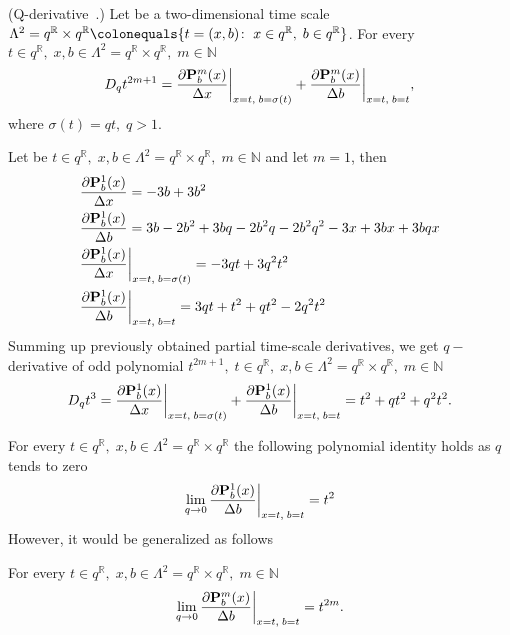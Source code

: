 \begin{cor}
    \label{q_derivative_case}
    (Q-derivative~\cite{jackson_1909}.)
    Let be a two-dimensional time scale
    $\Lambda^2 = q^{\mathbb{R}} \times q^{\mathbb{R}} \colonequals \{t=(x,b) \colon \; x\in q^{\mathbb{R}}, \; b \in q^{\mathbb{R}} \}$.
    For every $t\in q^{\mathbb{R}}, \; x,b\in \Lambda^2 = q^{\mathbb{R}} \times q^{\mathbb{R}}, \; m\in\mathbb{N}$
    \[
        D_{q} t^{2m+1}
        = \frac{\partial {\mathbf{P}}\sp{m} \sb{b}(x)}{\Delta x} \bigg |_{x = t, \; b = \sigma(t)}
        + \frac{\partial {\mathbf{P}}\sp{m} \sb{b}(x)}{\Delta b} \bigg |_{x = t, \; b = t},
    \]
    where $\sigma(t) = qt, \; q > 1$.
\end{cor}
\begin{examp}
    Let be $t\in q^{\mathbb{R}}, \; x,b\in \Lambda^2 = q^{\mathbb{R}} \times q^{\mathbb{R}}, \; m\in\mathbb{N}$
    and let $m=1$, then
    \begin{align*}
        &\frac{\partial {\mathbf{P}}\sp{1} \sb{b}(x)}{\Delta x} = -3 b + 3 b^2 \\
        &\frac{\partial {\mathbf{P}}\sp{1} \sb{b}(x)}{\Delta b} = 3 b - 2 b^2 + 3 b q - 2 b^2 q - 2 b^2 q^2 - 3 x + 3 b x + 3 b q x \\
        &\frac{\partial {\mathbf{P}}\sp{1} \sb{b}(x)}{\Delta x} \bigg |_{x = t, \; b = \sigma(t)} = -3 q t + 3 q^2 t^2 \\
        &\frac{\partial {\mathbf{P}}\sp{1} \sb{b}(x)}{\Delta b} \bigg |_{x = t, \; b = t} = 3 q t + t^2 + q t^2 - 2 q^2 t^2
    \end{align*}
    Summing up previously obtained partial time-scale derivatives, we get $q-$derivative of odd polynomial
    $t^{2m+1}, \; t\in q^{\mathbb{R}}, \; x,b\in \Lambda^2 = q^{\mathbb{R}} \times q^{\mathbb{R}}, \; m\in\mathbb{N}$
    \[
        D_{q} t^{3}
        = \frac{\partial {\mathbf{P}}\sp{1} \sb{b}(x)}{\Delta x} \bigg |_{x = t, \; b = \sigma(t)}
        + \frac{\partial {\mathbf{P}}\sp{1} \sb{b}(x)}{\Delta b} \bigg |_{x = t, \; b = t}
        = t^2 + q t^2 + q^2 t^2.
    \]
\end{examp}
For every $t\in q^{\mathbb{R}}, \; x,b\in \Lambda^2 = q^{\mathbb{R}} \times q^{\mathbb{R}}$
the following polynomial identity holds as $q$ tends to zero
\[
    \lim \limits_{q \to 0} \frac{\partial {\mathbf{P}}\sp{1} \sb{b}(x)}{\Delta b} \bigg |_{x = t, \; b = t} = t^2
\]
However, it would be generalized as follows
\begin{cor}
    For every $t\in q^{\mathbb{R}}, \; x,b\in \Lambda^2 = q^{\mathbb{R}} \times q^{\mathbb{R}}, \; m\in\mathbb{N}$
    \[
        \lim \limits_{q \to 0} \frac{\partial {\mathbf{P}}\sp{m} \sb{b}(x)}{\Delta b} \bigg |_{x = t, \; b = t} = t^{2m}.
    \]
\end{cor}
